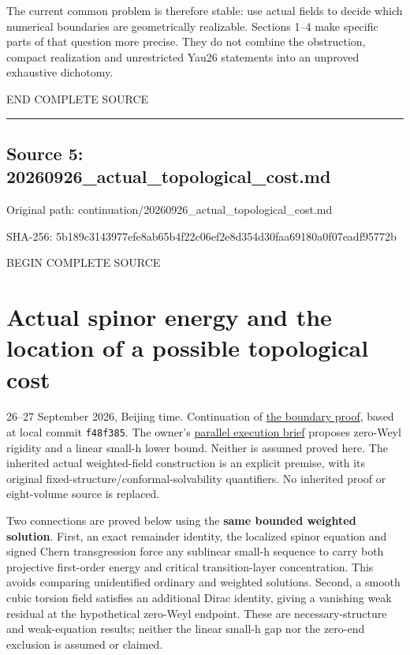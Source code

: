 \documentclass[
  10pt,
]{article}
\begin{document}
The current common problem is therefore stable: use actual fields to
decide which numerical boundaries are geometrically realizable. Sections
1--4 make specific parts of that question more precise. They do not
combine the obstruction, compact realization and unrestricted Yau26
statements into an unproved exhaustive dichotomy.

END COMPLETE SOURCE

\begin{center}\rule{0.5\linewidth}{0.5pt}\end{center}

\hypertarget{source-5-20260926_actual_topological_cost.md}{%
\subsection{Source 5:
20260926\_actual\_topological\_cost.md}\label{source-5-20260926_actual_topological_cost.md}}

Original path: continuation/20260926\_actual\_topological\_cost.md

SHA-256:
5b189c3143977efe8ab65b4f22c06ef2e8d354d30faa69180a0f07eadf95772b

BEGIN COMPLETE SOURCE

\hypertarget{actual-spinor-energy-and-the-location-of-a-possible-topological-cost}{%
\section{Actual spinor energy and the location of a possible topological
cost}\label{actual-spinor-energy-and-the-location-of-a-possible-topological-cost}}

26--27 September 2026, Beijing time. Continuation of
\href{20260926_boundary_compatibility.md}{the boundary proof}, based at
local commit \texttt{f48f385}. The owner's
\href{../guidance/source/20260926_web_parallel_execution.zh.md}{parallel
execution brief} proposes zero-Weyl rigidity and a linear small-h lower
bound. Neither is assumed proved here. The inherited actual
weighted-field construction is an explicit premise, with its original
fixed-structure/conformal-solvability quantifiers. No inherited proof or
eight-volume source is replaced.

Two connections are proved below using the \textbf{same bounded weighted
solution}. First, an exact remainder identity, the localized spinor
equation and signed Chern transgression force any sublinear small-h
sequence to carry both projective first-order energy and critical
transition-layer concentration. This avoids comparing unidentified
ordinary and weighted solutions. Second, a smooth cubic torsion field
satisfies an additional Dirac identity, giving a vanishing weak residual
at the hypothetical zero-Weyl endpoint. These are necessary-structure
and weak-equation results; neither the linear small-h gap nor the
zero-end exclusion is assumed or claimed.
\end{document}
